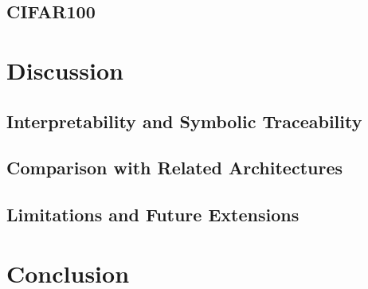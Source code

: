 \documentclass{article}
\begin{document}
\subsection{CIFAR100}
\section{Discussion}
\subsection{Interpretability and Symbolic Traceability}
\subsection{Comparison with Related Architectures}
\subsection{Limitations and Future Extensions}
\section{Conclusion}







\end{document}

